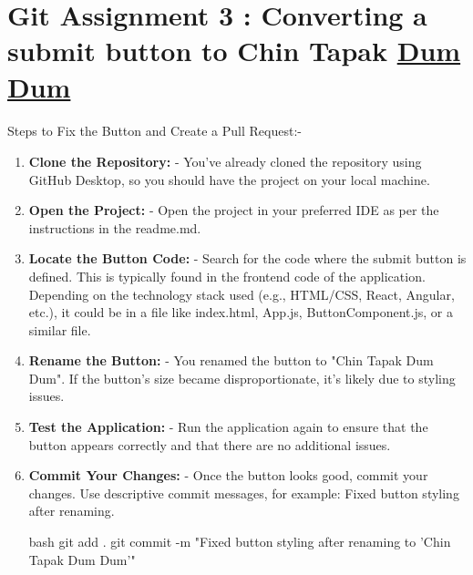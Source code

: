 \documentclass[a4paper,12pt]{article}
\begin{document}
\section*{\large{Git Assignment 3 : Converting a submit button to Chin Tapak \underline{Dum Dum}}}
\paragraph{}
\begin{flushleft}
\text{\#}Steps to Fix the Button and Create a Pull Request:-\\
\end{flushleft}
\vspace{0.5 cm}
\begin{enumerate}
\item\textbf{Clone the Repository:}
   - You’ve already cloned the repository using GitHub Desktop, so you should have the project on your local machine.\\

\item\textbf{Open the Project:}
   - Open the project in your preferred IDE as per the instructions in the readme.md.\\

\item\textbf{Locate the Button Code:}
   - Search for the code where the submit button is defined. This is typically found in the frontend code of the application. Depending on the technology stack used (e.g., HTML/CSS, React, Angular, etc.), it could be in a file like index.html, App.js, ButtonComponent.js, or a similar file.\\

\item\textbf{Rename the Button:}
   - You renamed the button to "Chin Tapak Dum Dum". If the button’s size became disproportionate, it’s likely due to styling issues.\\

\item\textbf{Test the Application:}
   - Run the application again to ensure that the button appears correctly and that there are no additional issues.\\

\item\textbf{Commit Your Changes:}
   - Once the button looks good, commit your changes. Use descriptive commit messages, for example: Fixed button styling after renaming.

   bash
   git add .
   git commit -m "Fixed button styling after renaming to 'Chin Tapak Dum Dum'"
   \\
   

\end{enumerate}
\end{document}

